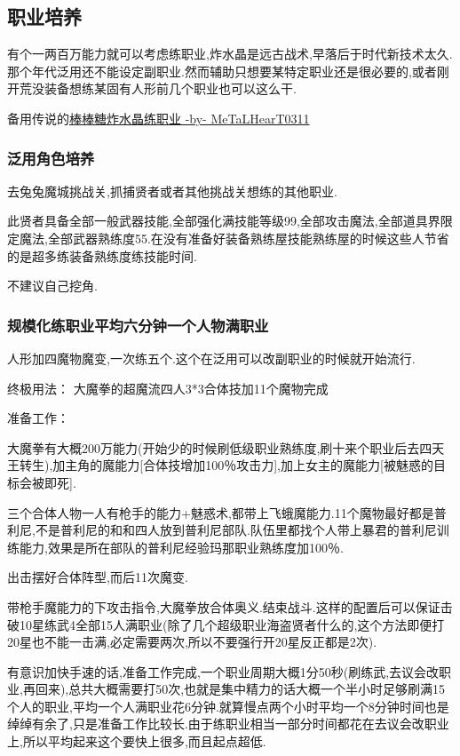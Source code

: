 	\subsection{职业培养}

	有个一两百万能力就可以考虑练职业,炸水晶是远古战术,早落后于时代新技术太久.那个年代泛用还不能设定副职业.然而辅助只想要某特定职业还是很必要的,或者刚开荒没装备想练某固有人形前几个职业也可以这么干.

	备用传说的\href{http://tieba.baidu.com/p/3717431968}{棒棒糖炸水晶练职业 -by- MeTaLHearT0311}

		\subsubsection{泛用角色培养}

		去兔兔魔城挑战关,抓捕贤者或者其他挑战关想练的其他职业.

		此贤者具备全部一般武器技能,全部强化满技能等级99,全部攻击魔法,全部道具界限定魔法,全部武器熟练度55.在没有准备好装备熟练屋技能熟练屋的时候这些人节省的是超多练装备熟练度练技能时间.

		不建议自己挖角.


		\subsubsection{规模化练职业平均六分钟一个人物满职业}

		人形加四魔物魔变,一次练五个.这个在泛用可以改副职业的时候就开始流行.

		终极用法：
		大魔拳的超魔流四人3*3合体技加11个魔物完成

		准备工作：

		大魔拳有大概200万能力(开始少的时候刷低级职业熟练度,刷十来个职业后去四天王转生),加主角的魔能力[合体技增加100％攻击力],加上女主的魔能力[被魅惑的目标会被即死].

		三个合体人物一人有枪手的能力+魅惑术,都带上飞蛾魔能力.11个魔物最好都是普利尼,不是普利尼的和和四人放到普利尼部队.队伍里都找个人带上暴君的普利尼训练能力,效果是所在部队的普利尼经验玛那职业熟练度加100％.

		出击摆好合体阵型,而后11次魔变.

		带枪手魔能力的下攻击指令,大魔拳放合体奥义.结束战斗.这样的配置后可以保证击破10星练武4全部15人满职业(除了几个超级职业海盗贤者什么的,这个方法即便打20星也不能一击满,必定需要两次,所以不要强行开20星反正都是2次).

		有意识加快手速的话,准备工作完成,一个职业周期大概1分50秒(刷练武,去议会改职业,再回来),总共大概需要打50次,也就是集中精力的话大概一个半小时足够刷满15个人的职业,平均一个人满职业花6分钟.就算慢点两个小时平均一个8分钟时间也是绰绰有余了,只是准备工作比较长.由于练职业相当一部分时间都花在去议会改职业上,所以平均起来这个要快上很多,而且起点超低.

